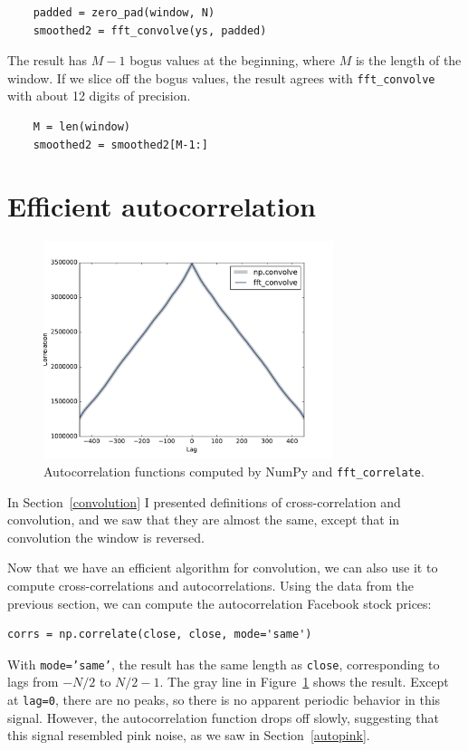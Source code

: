 \documentclass[12pt]{book}
\begin{document}
\begin{verbatim}
    padded = zero_pad(window, N)
    smoothed2 = fft_convolve(ys, padded)
\end{verbatim}

The result has $M-1$ bogus values at the beginning, where $M$ is the
length of the window.  If we slice off the bogus values, the result
agrees with \verb"fft_convolve" with about 12 digits of precision.

\begin{verbatim}
    M = len(window)
    smoothed2 = smoothed2[M-1:]
\end{verbatim}


\section{Efficient autocorrelation}

\begin{figure}
\centerline{\includegraphics[height=2.5in]{figs/convolution9.pdf}}
\caption{Autocorrelation functions computed by NumPy and
  {\tt fft\_correlate}.}
\label{fig.convolution9}
\end{figure}

In Section~\ref{convolution} I presented definitions of
cross-correlation and convolution, and we saw that they are
almost the same, except that in convolution the window is
reversed.

Now that we have an efficient algorithm for convolution, we
can also use it to compute cross-correlations and autocorrelations.
Using the data from the previous section, we can compute the
autocorrelation Facebook stock prices:

\begin{verbatim}
corrs = np.correlate(close, close, mode='same')
\end{verbatim}

With {\tt mode='same'}, the result has the same length as {\tt close},
corresponding to lags from $-N/2$ to $N/2-1$.
The gray line in Figure~\ref{fig.convolution9} shows the result.
Except at {\tt lag=0}, there are no peaks, so there is no apparent
periodic behavior in this signal.  However, the autocorrelation
function drops off slowly, suggesting that this signal resembled
pink noise, as we saw in Section~\ref{autopink}.
\end{document}
